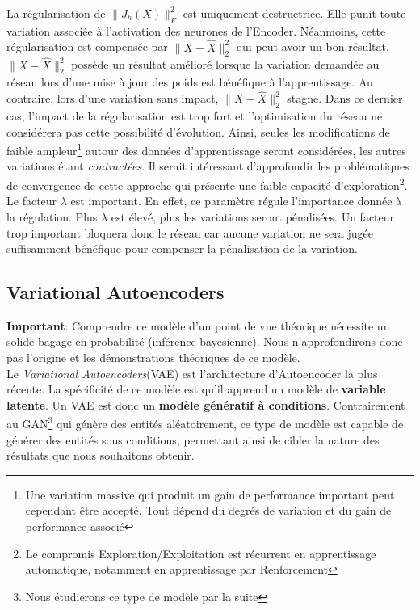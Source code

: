 \noindent La régularisation de $\lVert J_h(X) \rVert_F^2$ est uniquement destructrice. Elle punit toute variation associée à l'activation des neurones de l'Encoder. Néanmoins, cette régularisation est compensée par $\lVert X - \hat{X} \rVert_2^2$ qui peut avoir un bon résultat. $\lVert X - \hat{X} \rVert_2^2$ possède un résultat amélioré lorsque la variation demandée au réseau lors d'une mise à jour des poids est bénéfique à l'apprentissage. Au contraire, lors d'une variation sans impact, $\lVert X - \hat{X} \rVert_2^2$ stagne. Dans ce dernier cas, l'impact de la régularisation est trop fort et l'optimisation du réseau ne considérera pas cette possibilité d'évolution. Ainsi, seules les modifications de faible ampleur\footnote{Une variation massive qui produit un gain de performance important peut cependant être accepté. Tout dépend du degrés de variation et du gain de performance associé} autour des données d'apprentissage seront considérées, les autres variations étant \textit{contractées}. Il serait intéressant d'approfondir les problématiques de convergence de cette approche qui présente une faible capacité d'exploration\footnote{Le compromis Exploration/Exploitation est récurrent en apprentissage automatique, notamment en apprentissage par Renforcement}.\\

\noindent Le facteur $\lambda$ est important. En effet, ce paramètre régule l'importance donnée à la régulation. Plus $\lambda$ est élevé, plus les variations seront pénalisées. Un facteur trop important bloquera donc le réseau car aucune variation ne sera jugée suffisamment bénéfique pour compenser la pénalisation de la variation.

\subsection{Variational Autoencoders}
\textbf{Important}: Comprendre ce modèle d'un point de vue théorique nécessite un solide bagage en probabilité (inférence bayesienne). Nous n'approfondirons donc pas l'origine et les démonstrations théoriques de ce modèle.\\

\noindent Le \textit{Variational Autoencoders}(VAE)\cite{varauto1}\cite{varauto2} est l'architecture d'Autoencoder la plus récente. La spécificité de ce modèle est qu'il apprend un modèle de \textbf{variable latente}. Un VAE est donc un \textbf{modèle génératif à conditions}. Contrairement au GAN\footnote{Nous étudierons ce type de modèle par la suite} qui génère des entités aléatoirement, ce type de modèle est capable de générer des entités sous conditions, permettant ainsi de cibler la nature des résultats que nous souhaitons obtenir.\\

